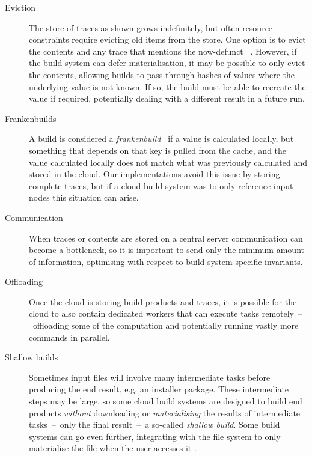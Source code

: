 \begin{description}
\item[Eviction] The store of traces as shown grows indefinitely, but often
resource constraints require evicting old items from the store. One option is
to evict the contents and any trace that mentions the now-defunct
~. However, if the build system can defer materialisation, it
may be possible to only evict the contents, allowing builds to pass-through
hashes of values where the underlying value is not known. If so, the build must
be able to recreate the value if required, potentially dealing with a different
result in a future run.

\item[Frankenbuilds] A build is considered a
\emph{frankenbuild}~\cite{esfahani2016cloudbuild} if a value is calculated
locally, but something that depends on that key is pulled from the cache, and
the value calculated locally does not match what was previously calculated and
stored in the cloud. 
Our implementations avoid this issue by storing complete
traces, but if a cloud build system was to only reference input nodes this
situation can arise.

\item[Communication] When traces or contents are stored on a central server
communication can become a bottleneck, so it is important to send only the
minimum amount of information, optimising with respect to build-system specific
invariants.

\item[Offloading] Once the cloud is storing build products and traces, it is
possible for the cloud to also contain dedicated workers that can execute tasks
remotely~--~offloading some of the computation and potentially running vastly
more commands in parallel.

\item[Shallow builds] Sometimes input files will involve many intermediate tasks
before producing the end result, e.g. an installer package. These intermediate
steps may be large, so some cloud build systems are designed to build end
products \emph{without} downloading or \emph{materialising} the results of
intermediate tasks~--~only the final result~--~a so-called \emph{shallow build}.
Some build systems can go even further, integrating with the file system to only
materialise the file when the user accesses it \cite{gvfs}.
\end{description}

